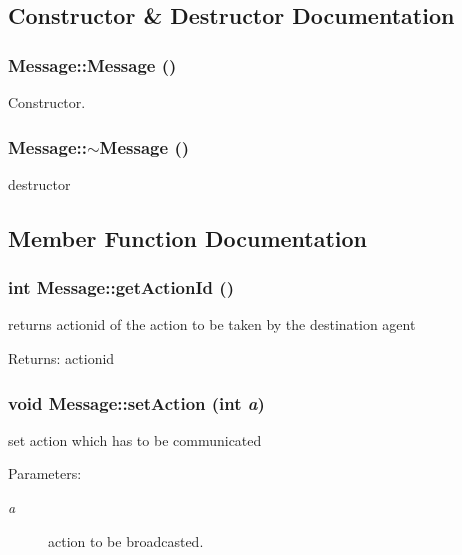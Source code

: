 \subsection{Constructor \& Destructor Documentation}
\subsubsection[Message]{\setlength{\rightskip}{0pt plus 5cm}Message::Message ()}\label{classMessage_4fc4f717b634e66070366cb7722d7761}


Constructor. 

\subsubsection[$\sim$Message]{\setlength{\rightskip}{0pt plus 5cm}Message::$\sim$Message ()}\label{classMessage_3f7275462831f787a861271687bcad67}


destructor 



\subsection{Member Function Documentation}
\subsubsection[getActionId]{\setlength{\rightskip}{0pt plus 5cm}int Message::getActionId ()}\label{classMessage_b432b3eee3b03fb5b7b25b530898fa96}


returns actionid of the action to be taken by the destination agent \begin{Desc}
\item[Returns:]actionid \end{Desc}
\subsubsection[setAction]{\setlength{\rightskip}{0pt plus 5cm}void Message::setAction (int {\em a})}\label{classMessage_6cc1ac636810840ebeef7f78234fed93}


set action which has to be communicated \begin{Desc}
\item[Parameters:]
\begin{description}
\item[{\em a}]action to be broadcasted. \end{description}
\end{Desc}
